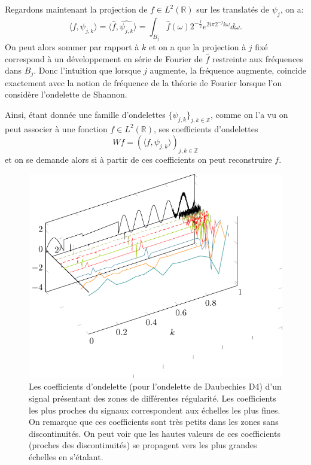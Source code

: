 \begin{remarque}
	Regardons maintenant la projection de $f\in L^2(\mathbb{R})$ sur les translatés de $\psi_j$, on a:
	\begin{equation}
		\langle f, \psi_{j,k} \rangle = \langle \hat{f}, \widehat{\psi_{j,k}} \rangle = \int_{B_j} \hat{f}(\omega) 2^{-\frac{j}{2}} e^{2i\pi2^{-j}k\omega} d\omega.
	\end{equation}	
	On peut alors sommer par rapport à $k$ et on a que la projection à $j$ fixé correspond à un développement en série de Fourier de $\hat{f}$ restreinte aux fréquences dans $B_j$.
	Donc l'intuition que lorsque $j$ augmente, la fréquence augmente, coincide exactement avec la notion de fréquence de la théorie de Fourier lorsque l'on considère l'ondelette de Shannon.
\end{remarque}

Ainsi, étant donnée une famille d'ondelettes $\{\psi_{j,k}\}_{j,k \in \mathbb{Z}}$, comme on l'a vu on peut associer à une fonction $f\in L^2(\mathbb{R})$, ses coefficients d'ondelettes
\begin{equation}
	Wf = (\langle f, \psi_{j,k} \rangle )_{j,k \in \mathbb{Z}}
\end{equation}
et on se demande alors si à partir de ces coefficients on peut reconstruire $f$.
\begin{figure}[h]
	\includegraphics{Figs/wavelet}
	\caption{Les coefficients d'ondelette (pour l'ondelette de Daubechies D4) d'un signal présentant des zones de différentes régularité. Les coefficients les plus proches du signaux correspondent aux échelles les plus fines. On remarque que ces coefficients sont très petits dans les zones sans discontinuités. On peut voir que les hautes valeurs de ces coefficients (proches des discontinuités) se propagent vers les plus grandes échelles en s'étalant.}
\end{figure}
